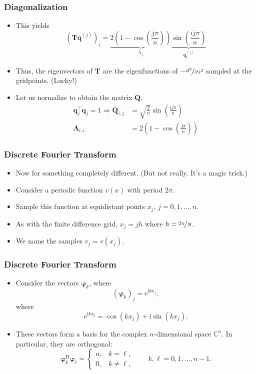 \begin{frame}
  \frametitle{Diagonalization}
  \begin{itemize}
  \item This yields
    \[
      (\bm T \overline {\bm q}^{(j)})_i =
      \underbrace{2 \left( 1 - \cos \left( \frac{j\pi}{n} \right)
        \right)}_{\lambda_j}
      \underbrace{\sin\left( \frac{ij\pi}{n} \right)}_{\overline {\bm q}^{(j)}_i}
    \]
  \item Thus, the eigenvectors of $\bm T$ are the eigenfunctions of
    $-\nicefrac{\partial^2}{\partial x^2}$ sampled at the gridpoints. (Lucky!)
  \item Let us normalize to obtain the matrix $\bm Q$.
    \begin{align*}
      \bm q_j^\intercal \bm q_j = 1 \Rightarrow
      \bm Q_{i,j} &= \sqrt{\frac{2}{n}} \sin\left( \frac{ij\pi}{n} \right) \\
      \bm \Lambda_{i,i} &= 2\left( 1 - \cos\left( \frac{j\pi}{n} \right) \right)
    \end{align*}
  \end{itemize}
\end{frame}

\begin{frame}
  \frametitle{Discrete Fourier Transform}
  \begin{itemize}
  \item Now for something completely different. (But not really. It's a magic
    trick.)
  \item Consider a periodic function $v(x)$ with period $2\pi$.
  \item Sample this function at equidistant points $x_j$, $j=0,1,\ldots,n$.
  \item As with the finite difference grid, $x_j = jh$ where
    $h = \nicefrac{2\pi}{N}$.
  \item We name the samples $v_j = v(x_j)$.
  \end{itemize}
  \begin{center}
    
  \end{center}
\end{frame}

\begin{frame}
  \frametitle{Discrete Fourier Transform}
  \begin{itemize}
  \item Consider the vectors $\bm \varphi_k$, where
    \[ (\bm \varphi_k)_j = \text{e}^{\text{i}kx_j}, \]
    where
    \[ \text{e}^{\text{i}kx_j} = \cos(kx_j) + \text{i} \sin(kx_j). \]
  \item These vectors form a basis for the complex $n$-dimensional space
    $\mathbb{C}^{n}$. In particular, they are orthogonal:
    \[
      \bm \varphi_k^\text{H} \bm \varphi_\ell =
      \begin{cases}
        n, & k = \ell, \\
        0, & k \not= \ell,
      \end{cases}
      \qquad k, \ell = 0,1,\ldots,n-1.
    \]
  \end{itemize}
\end{frame}

